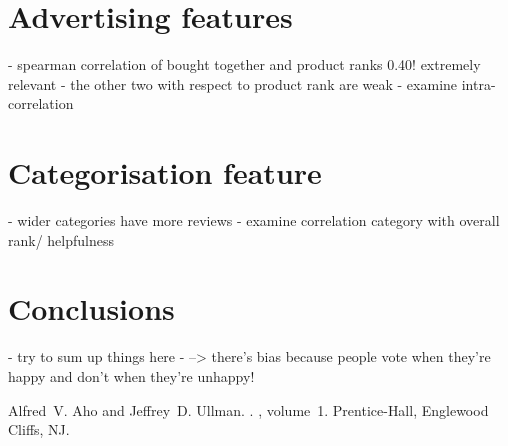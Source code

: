 \documentclass[11pt]{article}
\begin{document}
\section{Advertising features}
  - spearman correlation of bought together and product ranks 0.40! extremely relevant
  - the other two with respect to product rank are weak
  - examine intra-correlation

\section{Categorisation feature}
  - wider categories have more reviews 
  - examine correlation category with overall rank/ helpfulness

\section{Conclusions}
 - try to sum up things here 
 - --> there's bias because people vote when they're happy and don't when they're unhappy!

\begin{thebibliography}{}

Alfred~V. Aho and Jeffrey~D. Ullman.
.
, volume~1.
\newblock Prentice-{Hall}, Englewood Cliffs, NJ.

\end{thebibliography}
\end{document}
